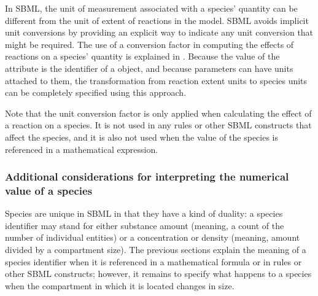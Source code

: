 In SBML, the unit of measurement associated with a species'
quantity can be different from the unit of extent of reactions in
the model.  SBML avoids implicit unit conversions by providing an
explicit way to indicate any unit conversion that might be
required.  The use of a conversion factor in computing the effects
of reactions on a species' quantity is explained in
.  Because the value of
the  attribute is the identifier of a
\Parameter object, and because parameters can have units attached
to them, the transformation from reaction extent units to species
units can be completely specified using this approach.

Note that the unit conversion factor is only applied when
calculating the effect of a reaction on a species.  It is not used
in any rules or other SBML constructs that affect the species, and
it is also not used when the value of the species is referenced in
a mathematical expression.


\subsubsection{Additional considerations for interpreting the
  numerical value of a species}
\label{sec:species-meaning}

Species are unique in SBML in that they have a kind of duality: a
species identifier may stand for either substance amount (meaning,
a count of the number of individual entities) or a concentration
or density (meaning, amount divided by a compartment size).  The
previous sections explain the meaning of a species identifier when
it is referenced in a mathematical formula or in rules or other
SBML constructs; however, it remains to specify what happens to a
species when the compartment in which it is located changes in
size.

